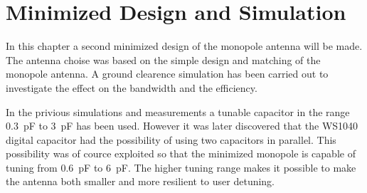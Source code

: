 \chapter{Minimized Design and Simulation}
\label{cha_intro_5mm}
In this chapter a second minimized design of the monopole antenna will be made.
The antenna choise was based on the simple design and matching of the monopole antenna.
A ground clearence simulation has been carried out to investigate the effect on the bandwidth and the efficiency.

In the privious simulations and measurements a tunable capacitor in the range \SI{0.3}{pF} to \SI{3}{pF} has been used. However it was later discovered that the WS1040 digital capacitor had the possibility of using two capacitors in parallel. This possibility was of cource exploited so that the minimized monopole is capable of tuning from \SI{0.6}{pF} to \SI{6}{pF}. The higher tuning range makes it possible to make the antenna both smaller and more resilient to user detuning.
